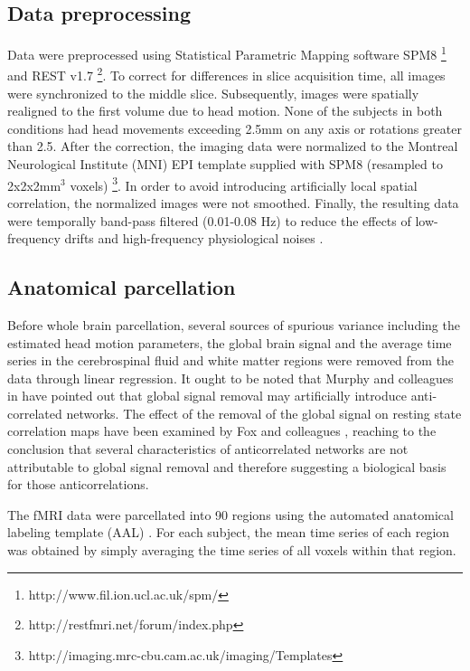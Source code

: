 \documentclass[12pt,a4paper]{article}
\begin{document}
\subsection{Data preprocessing} 
Data were preprocessed using Statistical Parametric Mapping software SPM8
\footnote{http://www.fil.ion.ucl.ac.uk/spm/} and REST v1.7
\footnote{http://restfmri.net/forum/index.php}. To correct for differences in
slice acquisition time, all images were synchronized to the middle slice.
Subsequently, images were spatially realigned to the first volume due to head
motion. None of the subjects in both conditions had head movements exceeding 2.5mm on any axis or
rotations greater than 2.5\textdegree. After the correction,  the imaging data were
normalized to the Montreal Neurological Institute (MNI) EPI template supplied
with SPM8 (resampled to 2x2x2mm$^3$ voxels) \footnote{http://imaging.mrc-cbu.cam.ac.uk/imaging/Templates}. In order to avoid introducing artificially local spatial correlation, the normalized images were
not smoothed. Finally, the resulting data were temporally band-pass filtered
(0.01-0.08 Hz) to reduce the effects of low-frequency drifts and high-frequency
physiological noises \cite{jiao_granger_2011}.

\subsection{Anatomical parcellation} 
Before whole brain parcellation, several sources of spurious variance including
the estimated head motion parameters, the global brain signal and the average
time series in the cerebrospinal fluid and white matter regions were removed
from the data through linear regression. It ought to be noted that Murphy and colleagues in \cite{murphy_impact_2009}  
have pointed out that global signal removal may artificially introduce anti-correlated networks. 
The effect of the removal of the global signal on resting state correlation maps have been examined by Fox and colleagues \cite{fox_global_2009}, reaching to the conclusion that several characteristics of anticorrelated networks are not attributable to global signal removal and therefore suggesting a biological basis for those anticorrelations. 

The fMRI data were parcellated into 90 regions using the automated anatomical labeling template (AAL) \cite{tzourio-mazoyer_automated_2002}. For each subject, the mean time series of each region was obtained by simply
averaging the time series of all voxels within that region.
\end{document}

